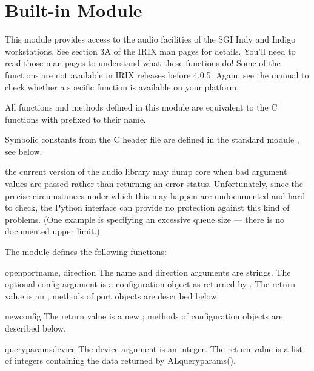 \section{Built-in Module }
\label{module-al}

This module provides access to the audio facilities of the SGI Indy
and Indigo workstations.  See section 3A of the IRIX man pages for
details.  You'll need to read those man pages to understand what these
functions do!  Some of the functions are not available in IRIX
releases before 4.0.5.  Again, see the manual to check whether a
specific function is available on your platform.

All functions and methods defined in this module are equivalent to
the C functions with  prefixed to their name.

Symbolic constants from the C header file  are defined
in the standard module , see below.

 the current version of the audio library may dump core
when bad argument values are passed rather than returning an error
status.  Unfortunately, since the precise circumstances under which
this may happen are undocumented and hard to check, the Python
interface can provide no protection against this kind of problems.
(One example is specifying an excessive queue size --- there is no
documented upper limit.)

The module defines the following functions:


\begin{funcdesc}{openport}{name, direction}
The name and direction arguments are strings.  The optional config
argument is a configuration object as returned by
.  The return value is an ;
methods of port objects are described below.
\end{funcdesc}

\begin{funcdesc}{newconfig}{}
The return value is a new ; methods of
configuration objects are described below.
\end{funcdesc}

\begin{funcdesc}{queryparams}{device}
The device argument is an integer.  The return value is a list of
integers containing the data returned by ALqueryparams().
\end{funcdesc}

